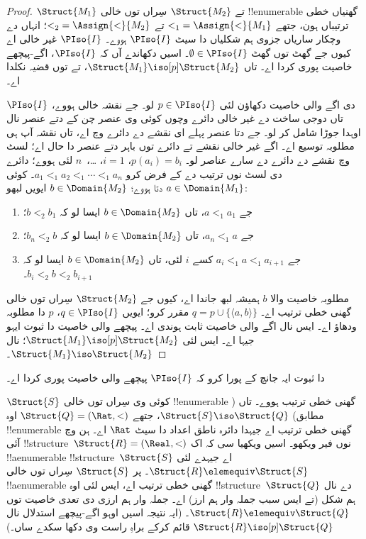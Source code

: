 \documentclass[../../../include/open-logic-section]{subfiles}
\begin{document}
\begin{proof}
  $\Struct{M_1}$ تے $\Struct{M_2}$ سِراں توں خالی
  !!{enumerable} گھنیاں خطی ترتیباں ہون، جتھے
  ${<_1} = \Assign{<}{M_1}$ تے ${<_2} =
  \Assign{<}{M_2}$؛ انہاں دے وچکار ساریاں جزوی ہم شکلیاں دا
  سیٹ $\PIso{I}$ ہووے۔ $\PIso{I}$ غیر خالی اے کیوں جے گھٹ توں گھٹ
  $\emptyset \in \PIso{I}$۔ اسیں دکھاندے آں کہ $\PIso{I}$،
  اگے-پیچھے خاصیت پوری کردا اے۔ تاں
  $\Struct{M_1} \iso[p] \Struct{M_2}$، تے
   توں قضیہ نکلدا اے۔

  $\PIso{I}$ دی اگے والی خاصیت دکھاؤن لئی $p \in
  \PIso{I}$ لو۔ جے نقشہ خالی ہووے، تاں دوجی ساخت دے غیر خالی دائرے
  وچوں کوئی وی عنصر چن کے دتے عنصر نال اوہدا جوڑا شامل کر لو۔ جے دتا
  عنصر پہلے ای نقشے دے دائرے وچ اے، تاں نقشہ آپ ہی مطلوبہ توسیع اے۔
  اگے غیر خالی نقشے تے دائرے توں باہر دتے عنصر دا حال اے؛ لسٹ وچ
  نقشے دے دائرے دے سارے عناصر لو۔ $p(a_i) = b_i$، $i = 1$، \dots،~$n$ لئی
  ہووے؛ دائرے دی لسٹ نوں ترتیب دے کے فرض کرو $a_1 <_1 a_2 <_1 \cdots <_1
  a_n$۔ کوئی $a \in \Domain{M_1}$ دتا ہووے؛ $b \in \Domain{M_2}$
  ایویں لبھو:
  \begin{enumerate}
  \item جے $a <_1 a_1$، تاں $b \in \Domain{M_2}$ ایسا لو
    کہ $b <_2
    b_1$؛
  \item جے $a_n <_1 a$، تاں $b \in \Domain{M_2}$ ایسا لو
    کہ $b_n <_2 b$؛
 \item جے $a_i <_1 a <_1 a_{i+1}$ کسے $i$ لئی، تاں
   $b \in
   \Domain{M_2}$ ایسا لو کہ $b_i <_2 b <_2 b_{i+1}$۔
  \end{enumerate}
  مطلوبہ خاصیت والا $b$ ہمیشہ لبھ جاندا اے، کیوں جے
  $\Struct{M_2}$ سِراں توں خالی گھنی خطی ترتیب اے۔
  $q = p \cup \{ \langle a, b \rangle \}$ مقرر کرو؛ ایویں
  $q \in \PIso{I}$، $p$ دا مطلوبہ ودھاؤ اے۔ ایس نال اگے
  والی خاصیت ثابت ہوندی اے۔ پیچھے والی خاصیت دا ثبوت ایہو
  جیہا اے۔ ایس لئی $\Struct{M_1} \iso[p]
  \Struct{M_2}$؛  نال
  $\Struct{M_1} \iso
  \Struct{M_2}$۔
\end{proof}

\begin{prob}
   دا ثبوت ایہ جانچ کے پورا
  کرو کہ $\PIso{I}$ پیچھے والی خاصیت پوری کردا اے۔
\end{prob}

\begin{rem}
  $\Struct{S}$ کوئی وی سِراں توں خالی !!{enumerable} گھنی
  خطی ترتیب ہووے۔ تاں ( مطابق)
  $\Struct{S} \iso
  \Struct{Q}$، جتھے $\Struct{Q} = (\Rat, <)$ اوہ
  !!{enumerable} گھنی خطی ترتیب اے جیہدا دائرہ ناطق اعداد دا
  سیٹ $\Rat$ اے۔ ہن  وچ آئی
  !!{structure}~$\Struct{R} =
  (\Real, <)$ نوں فیر ویکھو۔ اسیں ویکھیا سی کہ اک
  !!a{enumerable} !!{structure}~$\Struct{S}$ اے جیہدے لئی
  $\Struct{R}
  \elemequiv \Struct{S}$۔ پر $\Struct{S}$ سِراں توں خالی
  !!a{enumerable} گھنی خطی ترتیب اے، ایس لئی اوہ
  !!{structure}~$\Struct{Q}$ دے نال ہم شکل (تے ایس سبب
  جملہ وار ہم ارز) اے۔ جملہ وار ہم ارزی دی تعدی خاصیت توں
  $\Struct{R} \elemequiv
  \Struct{Q}$۔ (ایہ نتیجہ اسیں اوہو اگے-پیچھے استدلال نال
  $\Struct{R} \iso[p] \Struct{Q}$ قائم کرکے براہِ راست وی
  دکھا سکدے ساں۔)
\end{rem}
\end{document}
